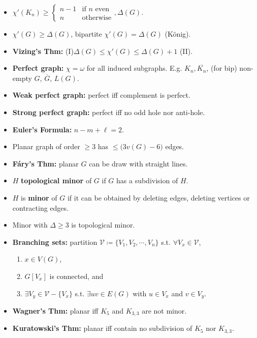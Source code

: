 \documentclass[10pt]{article}
\begin{document}
\begin{multicols*}{3}
\begin{itemize}
            \item $\chi'(K_n) \geq \begin{cases}
                n - 1 & \textrm{if } n \textrm{ even} \\
                n & \textrm{otherwise}
            \end{cases}, \Delta(G)$. 
            \item $\chi'(G) \geq \Delta(G)$, bipartite $\chi'(G) = \Delta(G)$ (K\"{o}nig).
            \item \textbf{Vizing's Thm:} (I)$\Delta(G) \leq \chi'(G) \leq \Delta(G) + 1$ (II). 
            \item \textbf{Perfect graph:} $\chi = \omega$ for all induced subgraphs. E.g. $K_n, \overline{K_n}$, (for bip) non-empty $G$, $\overline{G}$, $L(G)$.
            \item \textbf{Weak perfect graph:} perfect iff complement is perfect.
            \item \textbf{Strong perfect graph:} perfect iff no odd hole nor anti-hole.
            \item \textbf{Euler's Formula:} $n - m + \ell = 2$.
            \item Planar graph of order $\geq 3$ has $\leq \bigl(3v(G) - 6\bigr)$ edges.
            \item \textbf{F\'{a}ry's Thm:} planar $G$ can be draw with straight lines.
            \item $H$ \textbf{topological minor} of $G$ if $G$ has a subdivision of $H$.
            \item $H$ is \textbf{minor} of $G$ if it can be obtained by deleting edges, deleting vertices or contracting edges.
            \item Minor with $\Delta \geq 3$ is topological minor.
            \item \textbf{Branching sets:} partition $\mathcal{V} \coloneqq \{V_1, V_2, \cdots, V_n\}$ s.t. $\forall V_x \in \mathcal{V}$,
            \begin{enumerate}
                \item $x \in V(G)$,
                \item $G[V_x]$ is connected, and
                \item $\exists V_y \in \mathcal{V} - \{V_x\}$ s.t. $\exists uv \in E(G)$ with $u \in V_x$ and $v \in V_y$.
            \end{enumerate}
            \item \textbf{Wagner's Thm:} planar iff $K_5$ and $K_{3, 3}$ are not minor.
            \item \textbf{Kuratowski's Thm:} planar iff contain no subdivision of $K_5$ nor $K_{3, 3}$.

\end{itemize}
\end{multicols*}
\end{document}
